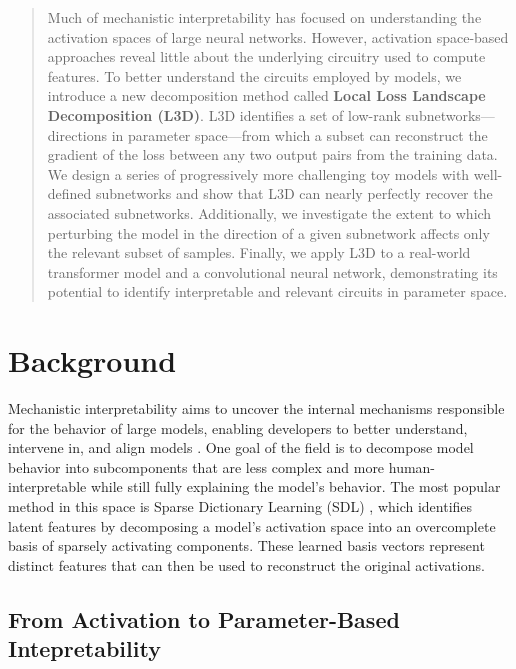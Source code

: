 \documentclass{article}
\theoremstyle{plain}
\theoremstyle{definition}
\theoremstyle{remark}
\begin{document}
\begin{abstract}
Much of mechanistic interpretability has focused on understanding the activation spaces of large neural networks. However, activation space-based approaches reveal little about the underlying circuitry used to compute features. To better understand the circuits employed by models, we introduce a new decomposition method called \textbf{Local Loss Landscape Decomposition (L3D)}. L3D identifies a set of low-rank subnetworks—directions in parameter space—from which a subset can reconstruct the gradient of the loss between any two output pairs from the training data. We design a series of progressively more challenging toy models with well-defined subnetworks and show that L3D can nearly perfectly recover the associated subnetworks. Additionally, we investigate the extent to which perturbing the model in the direction of a given subnetwork affects only the relevant subset of samples. Finally, we apply L3D to a real-world transformer model and a convolutional neural network, demonstrating its potential to identify interpretable and relevant circuits in parameter space.

\end{abstract}

\section{Background}

Mechanistic interpretability aims to uncover the internal mechanisms responsible for the behavior of large models, enabling developers to better understand, intervene in, and align models \cite{bereska2024mechanistic}. One goal of the field is to decompose model behavior into subcomponents that are less complex and more human-interpretable while still fully explaining the model's behavior. The most popular method in this space is Sparse Dictionary Learning (SDL) \cite{cunningham2023sparse,bricken2023towards,gao2024scaling}, which identifies latent features by decomposing a model's activation space into an overcomplete basis of sparsely activating components. These learned basis vectors represent distinct features that can then be used to reconstruct the original activations.



\subsection{From Activation to Parameter-Based Intepretability}\label{subsec:activation_to_parameter}
\end{document}
